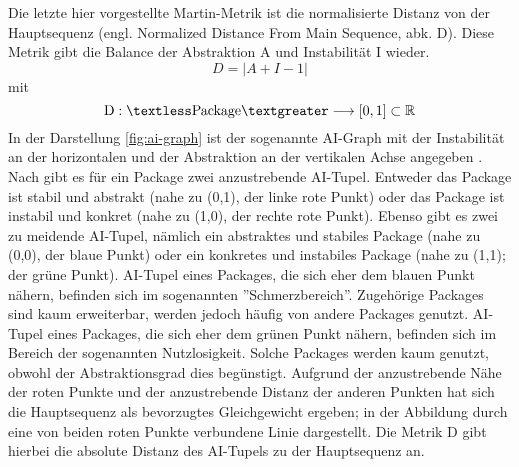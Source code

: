 \documentclass[12pt]{article}
\begin{document}
Die letzte hier vorgestellte Martin-Metrik ist die normalisierte
Distanz von der Hauptsequenz (engl. Normalized Distance From Main
Sequence, abk. D). Diese Metrik gibt die Balance der Abstraktion
A und Instabilität I wieder.
\[
        D = |A + I - 1|
\]
mit 
\[
        \text{D}: \textless \text{Package} \textgreater
        \longrightarrow [0,1] \subset \mathbb{R}
\]
In der Darstellung \ref{fig:ai-graph} ist der sogenannte AI-Graph
mit der Instabilität an der horizontalen und der Abstraktion an
der vertikalen Achse angegeben \cite{Mar94}.  Nach \cite{Mar94}
gibt es für ein Package zwei anzustrebende AI-Tupel. Entweder das
Package ist stabil und abstrakt (nahe zu (0,1), der linke rote
Punkt) oder das Package ist instabil und konkret (nahe zu (1,0),
der rechte rote Punkt). Ebenso gibt es zwei zu meidende AI-Tupel,
nämlich ein abstraktes und stabiles Package (nahe zu (0,0), der
blaue Punkt) oder ein konkretes und instabiles Package (nahe zu
(1,1); der grüne Punkt). AI-Tupel eines Packages, die sich eher dem blauen Punkt
nähern, befinden sich im sogenannten ''Schmerzbereich''.
Zugehörige Packages sind kaum erweiterbar, werden jedoch häufig
von andere Packages genutzt. AI-Tupel eines Packages, die sich eher dem grünen Punkt
nähern, befinden sich im Bereich der sogenannten Nutzlosigkeit.
Solche Packages werden kaum genutzt, obwohl der Abstraktionsgrad
dies begünstigt. Aufgrund der anzustrebende Nähe der roten Punkte
und der anzustrebende Distanz der anderen Punkten hat sich die
Hauptsequenz als bevorzugtes Gleichgewicht ergeben; in der
Abbildung durch eine von beiden roten Punkte verbundene Linie
dargestellt. Die Metrik D gibt hierbei die absolute Distanz des
AI-Tupels zu der Hauptsequenz an.

\end{document}
